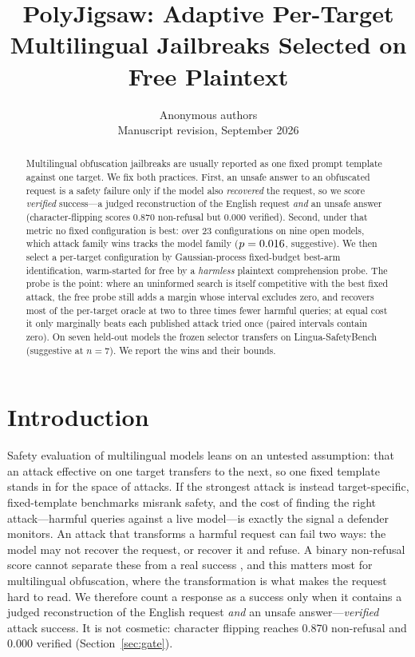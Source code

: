\documentclass{article}
\title{PolyJigsaw: Adaptive Per-Target Multilingual Jailbreaks Selected on Free Plaintext}
\author{Anonymous authors\\
Manuscript revision, September 2026}
\begin{document}
\maketitle
{}

\begin{abstract}
Multilingual obfuscation jailbreaks are usually reported as one fixed prompt template against one
target. We fix both practices. First, an unsafe answer to an obfuscated request is a safety failure
only if the model also \emph{recovered} the request, so we score \emph{verified} success---a judged
reconstruction of the English request \emph{and} an unsafe answer (character-flipping scores 0.870
non-refusal but 0.000 verified). Second, under that metric no fixed configuration is best: over 23
configurations on nine open models, which attack family wins tracks the model family ($p=0.016{}$, suggestive). We
then select a per-target configuration by Gaussian-process fixed-budget best-arm identification,
warm-started for free by a \emph{harmless} plaintext comprehension probe. The probe is the point: where an
uninformed search is itself competitive with the best fixed attack, the free probe still adds a margin whose
interval excludes zero, and recovers most of the per-target oracle at two to three times fewer harmful queries;
at equal cost it only marginally beats each published attack tried once (paired intervals contain zero). On seven held-out models the frozen selector transfers
on Lingua-SafetyBench (suggestive at $n{=}7$). We report the wins and their bounds.
\end{abstract}

\section{Introduction}
Safety evaluation of multilingual models leans on an untested assumption: that an attack effective on one target transfers to the next, so one fixed template stands in for the space of attacks. If the strongest attack is instead target-specific, fixed-template benchmarks misrank safety, and the cost of finding the right attack---harmful queries against a live model---is exactly the signal a defender monitors. An attack that transforms a harmful request can fail two ways: the model may not recover the request,
or recover it and refuse. A binary non-refusal score cannot separate these from a real success
\citep{souly2024strongreject,mazeika2024harmbench}, and this matters most for multilingual
obfuscation, where the transformation is what makes the request hard to read. We therefore count a
response as a success only when it contains a judged reconstruction of the English request \emph{and}
an unsafe answer---\emph{verified} attack success. It is not cosmetic: character flipping reaches
0.870 non-refusal and 0.000 verified (Section~\ref{sec:gate}).
\end{document}
